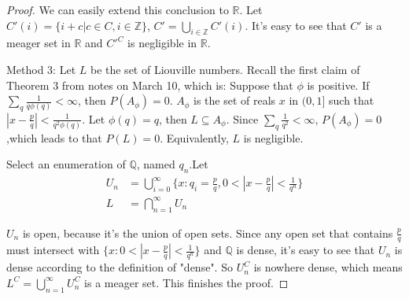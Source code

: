 \documentclass[a4paper, linespread=1.5]{article}
\begin{document}
\begin{proof}
		We can easily extend this conclusion to $\mathbb{R}$. Let $C'(i)=\{i+c | c\in C, i\in\mathbb{Z}\}$, $C'=\bigcup\limits_{i\in\mathbb{Z}}C'(i)$. It's easy to see that $C'$ is a meager set in $\mathbb{R}$ and $C'^C$ is negligible in $\mathbb{R}$.
		
		Method 3:
		Let $L$ be the set of Liouville numbers.
		Recall the first claim of Theorem 3 from notes on March 10, which is:
		Suppose that $\phi$ is positive. If $\sum_{q}\frac{1}{q\phi(q)}<\infty$, then $P(A_\phi)=0$. $A_\phi$ is the set of reals $x$ in $(0,1]$ such that $|x-\frac{p}{q}| < \frac{1}{q^2\phi(q)}$. Let $\phi(q)=q$, then $L \subseteq A_\phi$.
		Since $\sum_{q}\frac{1}{q^2}<\infty$, $P(A_\phi)=0$,which leads to that $P(L)=0$. Equivalently, $L$ is negligible. 
		
		Select an enumeration of $\mathbb{Q}$, named $q_n$.Let
		\begin{align*}
			U_n&=\bigcup\limits_{i=0}^{\infty}\{x :  q_i=\frac{p}{q},0<|x-\frac{p}{q}| < \frac{1}{q^n}\}\\
			L&=\bigcap\limits_{n=1}^{\infty}U_n
		\end{align*}
		
		$U_n$ is open, because it's the union of open sets. Since any open set that contains $\frac{p}{q}$ must intersect with $\{x :  0<|x-\frac{p}{q}| < \frac{1}{q^n}\}$ and $\mathbb{Q}$ is dense, it's easy to see that $U_n$ is dense according to the definition of "dense". So $U_n^C$ is nowhere dense, which means $L^C=\bigcup\limits_{n=1}^{\infty}U_n^C$ is a meager set. This finishes the proof.
	\end{proof}
	
	
    
    
\end{document}
